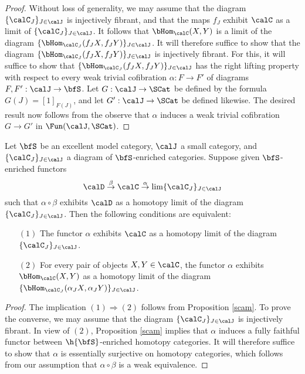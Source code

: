 \begin{proof}
Without loss of generality, we may assume that the diagram $\{ \calC_{J} \}_{J \in \calJ}$ is injectively fibrant, and that the maps $f_{J}$ exhibit $\calC$ as a limit of $\{ \calC_{J} \}_{J \in \calJ}$. 
It follows that $\bHom_{\calC}(X,Y)$ is a limit of the diagram $\{ \bHom_{\calC_J}( f_J X, f_J Y) \}_{J \in \calJ}$.
It will therefore suffice to show that the diagram $\{ \bHom_{ \calC_{J}}( f_J X, f_J Y) \}_{J \in \calJ}$
is injectively fibrant. For this, it will suffice to show that $\{ \bHom_{ \calC_{J}}( f_J X, f_J Y) \}_{J \in \calJ}$
has the right lifting property with respect to every weak trivial cofibration 
$\alpha: F \rightarrow F'$ of diagrams $F,F': \calJ \rightarrow \bfS$. Let
$G: \calJ \rightarrow \SCat$ be defined by the formula
$G(J) = [1]_{F(J)}$, and let $G': \calJ \rightarrow \SCat$ be defined likewise. The desired
result now follows from the observe that $\alpha$ induces a weak trivial cofibration
$G \rightarrow G'$ in $\Fun( \calJ, \SCat)$. 
\end{proof}

\begin{corollary}\label{wspin}
Let $\bfS$ be an excellent model category, $\calJ$ a small category, and
$\{ \calC_{J} \}_{J \in \calJ}$ a diagram of $\bfS$-enriched categories.
Suppose given $\bfS$-enriched functors
$$ \calD \stackrel{\beta}{\rightarrow} \calC \stackrel{\alpha}{\rightarrow} \lim \{ \calC_{J} \}_{J \in \calJ} $$
such that $\alpha \circ \beta$ exhibits $\calD$ as a homotopy limit of the diagram
$\{ \calC_{J} \}_{J \in \calJ}$. Then the following conditions are equivalent:
\begin{itemize}
\item[$(1)$] The functor $\alpha$ exhibits $\calC$ as a homotopy limit of the diagram
$\{ \calC_{J} \}_{J \in \calJ}$.
\item[$(2)$] For every pair of objects $X,Y \in \calC$, the functor $\alpha$ exhibits
$\bHom_{\calC}(X,Y)$ as a homotopy limit of the diagram $\{ \bHom_{\calC_{J}}( \alpha_{J} X,
\alpha_{J} Y ) \}_{J \in \calJ}$.
\end{itemize}
\end{corollary}

\begin{proof}
The implication $(1) \Rightarrow (2)$ follows from Proposition \ref{scam}. To prove the
converse, we may assume that the diagram $\{ \calC_{J} \}_{J \in \calJ}$ is injectively fibrant.
In view of $(2)$, Proposition \ref{scam} implies that $\alpha$ induces a fully faithful functor
between $\h{\bfS}$-enriched homotopy categories. It will therefore suffice to show that
$\alpha$ is essentially surjective on homotopy categories, which follows from our assumption that 
$\alpha \circ \beta$ is a weak equivalence. 
\end{proof}

